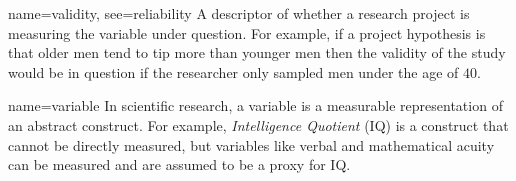{name={validity},
 see={reliability}}
{%
	A descriptor of whether a research project is measuring the variable under question. For example, if a project hypothesis is that older men tend to tip more than younger men then the validity of the study would be in question if the researcher only sampled men under the age of $ 40 $.
}

{name={variable}}
{%
	In scientific research, a variable is a measurable representation of an abstract construct. For example, \textit{Intelligence Quotient} (IQ) is a construct that cannot be directly measured, but variables like verbal and mathematical acuity can be measured and are assumed to be a proxy for IQ.
}
